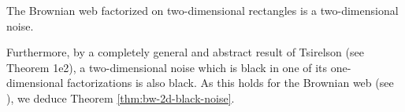 {\begin{proposition*}
The Brownian web factorized on two-dimensional
rectangles is a two-dimensional noise.
\end{proposition*}

Furthermore, by a completely general and abstract result
of Tsirelson (see
\cite{tsirelson-noise-as-a-boolean-algebra} Theorem 1e2),
a two-dimensional noise which is
black in one of its one-dimensional factorizations is also
black. As this holds for the Brownian web (see
\cite{tsirelson-nonclassical-stochastic-flows}),
we deduce Theorem \ref{thm:bw-2d-black-noise}.
}
